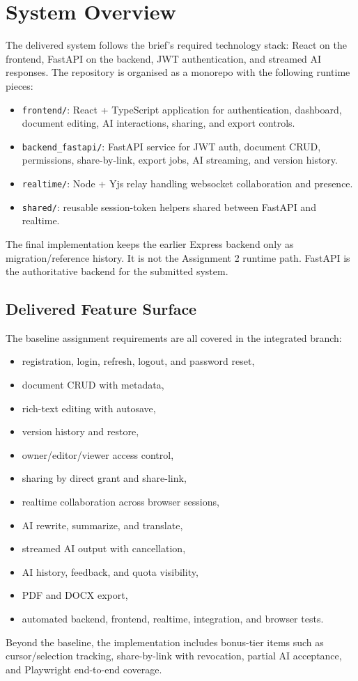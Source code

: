 \chapter{System Overview}

The delivered system follows the brief's required technology stack: React on the frontend, FastAPI on the
backend, JWT authentication, and streamed AI responses. The repository is organised as a monorepo with
the following runtime pieces:

\begin{itemize}
  \item \texttt{frontend/}: React + TypeScript application for authentication, dashboard, document editing,
  AI interactions, sharing, and export controls.
  \item \texttt{backend\_fastapi/}: FastAPI service for JWT auth, document CRUD, permissions,
  share-by-link, export jobs, AI streaming, and version history.
  \item \texttt{realtime/}: Node + Yjs relay handling websocket collaboration and presence.
  \item \texttt{shared/}: reusable session-token helpers shared between FastAPI and realtime.
\end{itemize}

The final implementation keeps the earlier Express backend only as migration/reference history. It is not
the Assignment 2 runtime path. FastAPI is the authoritative backend for the submitted system.

\section{Delivered Feature Surface}

The baseline assignment requirements are all covered in the integrated branch:

\begin{itemize}
  \item registration, login, refresh, logout, and password reset,
  \item document CRUD with metadata,
  \item rich-text editing with autosave,
  \item version history and restore,
  \item owner/editor/viewer access control,
  \item sharing by direct grant and share-link,
  \item realtime collaboration across browser sessions,
  \item AI rewrite, summarize, and translate,
  \item streamed AI output with cancellation,
  \item AI history, feedback, and quota visibility,
  \item PDF and DOCX export,
  \item automated backend, frontend, realtime, integration, and browser tests.
\end{itemize}

Beyond the baseline, the implementation includes bonus-tier items such as cursor/selection tracking,
share-by-link with revocation, partial AI acceptance, and Playwright end-to-end coverage.
